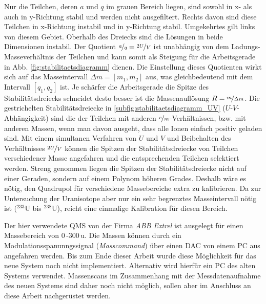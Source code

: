 Nur die Teilchen, deren $a$ und $q$ im grauen
Bereich liegen, sind sowohl in x- als auch in y-Richtung stabil und werden nicht
ausgefiltert. Rechts davon sind diese Teilchen in x-Richtung instabil und in
y-Richtung stabil. Umgekehrtes gilt links von diesem Gebiet. Oberhalb des
Dreiecks sind die Lösungen in beide Dimensionen instabil. Der Quotient
$\nicefrac{a}{q}=\nicefrac{2U}{V}$ ist unabhängig von dem Ladungs-Masseverhältnis der Teilchen und kann somit als Steigung für die Arbeitsgerade in Abb.
\ref{fig:stabilitaetsdiagramm} dienen. Die Einstellung dieses Quotienten wirkt
sich auf das Masseintervall $\Delta m=[m_1,m_2]$ aus, was
gleichbedeutend mit dem Intervall $[q_1,q_2]$ ist. Je schärfer die Arbeitsgerade die Spitze des
Stabilitätsdreiecks schneidet desto besser ist die Massenauflösung
$R=\nicefrac{m}{\Delta m}$. Die gestrichelten Stabilitätsdreiecke in
\ref{subfig:stabilitaetsdiagramm_UV} ($U$-$V$-Abhängigkeit) sind die der
Teilchen mit anderen $\nicefrac{e}{m}$-Verhältnissen, bzw. mit anderen Massen, wenn man davon
ausgeht, dass alle Ionen einfach positiv geladen sind.
Mit einem simultanen Verfahren von $U$ und $V$ und Beibehalten des Verhältnisses
$\nicefrac{2U}{V}$ können die Spitzen der Stabilitätsdreiecke von Teilchen verschiedener Masse angefahren und die entsprechenden Teilchen
selektiert werden. Streng genommen liegen die Spitzen der
Stabilitätsdreiecke nicht auf einer Geraden, sondern auf einem Polynom höheren
Grades. Deshalb wäre es nötig, den Quadrupol für verschiedene Massebereiche
extra zu kalibrieren. Da zur Untersuchung der Uranisotope aber nur ein sehr
begrenztes Masseintervall nötig ist ($^{233}$U bis $^{238}$U), reicht eine
einmalige Kalibration für diesen Bereich.\par
Der hier verwendete QMS von der Firma \textit{ABB
Extrel} ist ausgelegt für einen Massebereich von $0\,$-$300\,$u. Die Massen
können durch ein Modulationsspanunngssignal (\textit{Masscommand}) über einen
DAC von einem PC aus angefahren werden. Bis zum Ende dieser Arbeit wurde diese
Möglichkeit für das neue System noch nicht implementiert. Alternativ wird
hierfür ein PC des alten Systems verwendet. Massenscans im Zusammenhang mit der
Messdatenaufnahme des neuen Systems sind daher noch nicht möglich, sollen aber
im Anschluss an diese Arbeit nachgerüstet werden.

